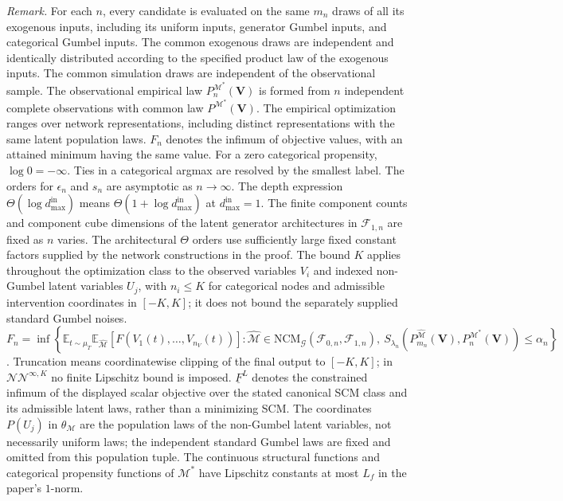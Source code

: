 \documentclass[12pt]{article}
\theoremstyle{plain}
\theoremstyle{definition}
\theoremstyle{remark}
\begin{document}
\noindent\textit{Remark.} For each $n$, every candidate is evaluated on the same $m_n$ draws of all its exogenous inputs, including its uniform inputs, generator Gumbel inputs, and categorical Gumbel inputs. The common exogenous draws are independent and identically distributed according to the specified product law of the exogenous inputs. The common simulation draws are independent of the observational sample. The observational empirical law $P_n^{\mathcal M^*}(\boldsymbol V)$ is formed from $n$ independent complete observations with common law $P^{\mathcal M^*}(\boldsymbol V)$. The empirical optimization ranges over network representations, including distinct representations with the same latent population laws. $F_n$ denotes the infimum of objective values, with an attained minimum having the same value. For a zero categorical propensity, $\log0=-\infty$. Ties in a categorical argmax are resolved by the smallest label. The orders for $\epsilon_n$ and $s_n$ are asymptotic as $n\rightarrow\infty$. The depth expression $\Theta(\log d_{\max}^{\text{in}})$ means $\Theta(1+\log d_{\max}^{\text{in}})$ at $d_{\max}^{\text{in}}=1$. The finite component counts and component cube dimensions of the latent generator architectures in $\mathcal F_{1,n}$ are fixed as $n$ varies. The architectural $\Theta$ orders use sufficiently large fixed constant factors supplied by the network constructions in the proof. The bound $K$ applies throughout the optimization class to the observed variables $V_i$ and indexed non-Gumbel latent variables $U_j$, with $n_i\leqslant K$ for categorical nodes and admissible intervention coordinates in $[-K,K]$; it does not bound the separately supplied standard Gumbel noises. $F_n=\inf\left\{\mathbb{E}_{t\sim\mu_T}\mathbb{E}_{\hat{\mathcal{M}}}[F(V_1(t),\ldots,V_{n_V}(t))]:\hat{\mathcal{M}}\in\text{NCM}_{\mathcal{G}}(\mathcal{F}_{0,n},\mathcal{F}_{1,n}),\ S_{\lambda_n}(P_{m_n}^{\hat{\mathcal{M}}}(\boldsymbol{V}),P_n^{\mathcal{M}^*}(\boldsymbol{V}))\leqslant\alpha_n\right\}$. Truncation means coordinatewise clipping of the final output to $[-K,K]$; in $\mathcal{NN}^{\infty,K}$ no finite Lipschitz bound is imposed. $\underline{F}^{L}$ denotes the constrained infimum of the displayed scalar objective over the stated canonical SCM class and its admissible latent laws, rather than a minimizing SCM. The coordinates $P(U_j)$ in $\theta_{\mathcal M}$ are the population laws of the non-Gumbel latent variables, not necessarily uniform laws; the independent standard Gumbel laws are fixed and omitted from this population tuple. The continuous structural functions and categorical propensity functions of $\mathcal M^*$ have Lipschitz constants at most $L_f$ in the paper's $1$-norm.
\end{document}
